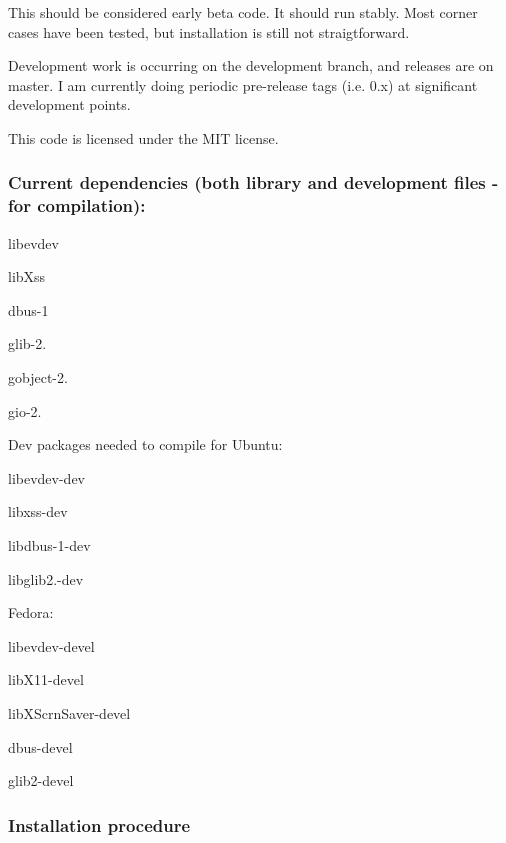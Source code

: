 This should be considered early beta code. It should run stably. Most corner cases have been tested, but installation is still not straigtforward.

Development work is occurring on the development branch, and releases are on master. I am currently doing periodic pre-\/release tags (i.\+e. 0.\+x) at significant development points.

This code is licensed under the M\+IT license.

\subsubsection*{Current dependencies (both library and development files -\/ for compilation)\+:}


\begin{DoxyItemize}
\item libevdev
\item lib\+Xss
\item dbus-\/1
\item glib-\/2.
\item gobject-\/2.
\item gio-\/2.
\end{DoxyItemize}

Dev packages needed to compile for Ubuntu\+:
\begin{DoxyItemize}
\item libevdev-\/dev
\item libxss-\/dev
\item libdbus-\/1-\/dev
\item libglib2.-\/dev
\end{DoxyItemize}

Fedora\+:
\begin{DoxyItemize}
\item libevdev-\/devel
\item lib\+X11-\/devel
\item lib\+X\+Scrn\+Saver-\/devel
\item dbus-\/devel
\item glib2-\/devel
\end{DoxyItemize}

\subsubsection*{Installation procedure}


